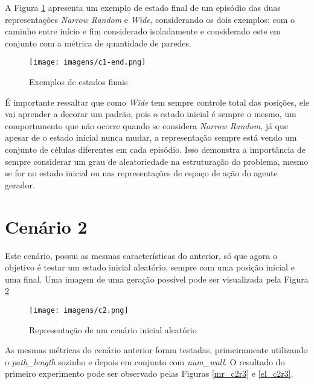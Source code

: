 \FloatBarrier



A Figura \ref{c1_end} apresenta um exemplo de estado final de um episódio das duas representações \textit{Narrow Random} e \textit{Wide},
considerando os dois exemplos: com o caminho entre início e fim considerado isoladamente e 
considerado este em conjunto com a métrica de quantidade de paredes.
\begin{figure}[htb]
	\caption{\label{c1_end}Exemplos de estados finais}
	\begin{center}
	    \texttt{[image: imagens/c1-end.png]}
	\end{center}
\end{figure}

\FloatBarrier
É importante ressaltar que como \textit{Wide} tem sempre controle total das posições, ele vai aprender a decorar um padrão, pois o estado
inicial é sempre o mesmo, um comportamento que não ocorre quando se considera \textit{Narrow Random}, já que apesar de o estado inicial 
nunca mudar, a representação sempre está vendo um conjunto de células diferentes em cada episódio. Isso demonstra a importância de 
sempre considerar um grau de aleatoriedade na estruturação do problema, mesmo se for no estado inicial ou nas representações
de espaço de ação do agente gerador.



\section{Cenário 2}
Este cenário, possui as mesmas características do anterior, só que agora o objetivo é testar
um estado inicial aleatório, sempre com uma posição inicial e uma final. Uma imagem de uma geração
possível pode ser visualizada pela Figura \ref{c2}

\begin{figure}[htb]
	\caption{\label{c2}Representação de um cenário inicial aleatório}
	\begin{center}
	    \texttt{[image: imagens/c2.png]}
	\end{center}
\end{figure}

\FloatBarrier

As mesmas métricas do cenário anterior foram testadas, primeiramente utilizando o \textit{path\_length} sozinho e depois
em conjunto com \textit{num\_wall}. O resultado do primeiro experimento pode ser observado pelas Figuras \ref{mr_c2r3}
e \ref{el_c2r3}.

